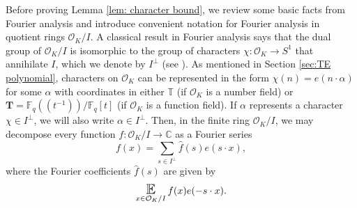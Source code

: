 \documentclass{amsart}
\theoremstyle{definition}
\numberwithin{equation}{section}
\newcommand{\C}{\mathbb{C}}
\newcommand{\T}{\mathbb{T}}
\newcommand{\F}{\mathbb{F}}
\newcommand{\mO}{\mathcal{O}}
\renewcommand{\hat}{\widehat}
\DeclareMathOperator*{\E}{\text{\Large $\mathbb{E}$}}
\begin{document}
Before proving Lemma \ref{lem: character bound}, we review some basic facts from Fourier analysis and introduce convenient notation for Fourier analysis in quotient rings $\mO_K/I$.
A classical result in Fourier analysis says that the dual group of $\mO_K/I$ is isomorphic to the group of characters $\chi : \mO_K \to S^1$ that annihilate $I$, which we denote by $I^{\perp}$ (see \cite[Theorem 2.1.2]{rudin}).
As mentioned in Section \ref{sec:TE polynomial}, characters on $\mO_K$ can be represented in the form $\chi(n) = e(n \cdot \alpha)$ for some $\alpha$ with coordinates in either $\T$ (if $\mO_K$ is a number field) or $\mathbf{T} = \F_q((t^{-1}))/\F_q[t]$ (if $\mO_K$ is a function field).
If $\alpha$ represents a character $\chi \in I^{\perp}$, we will also write $\alpha \in I^{\perp}$.
Then, in the finite ring $\mO_K/I$, we may decompose every function $f : \mO_K/I \to \C$ as a Fourier series
\begin{equation*}
    f(x) = \sum_{s \in I^{\perp}} \hat{f}(s) e(s \cdot x),
\end{equation*}
where the Fourier coefficients $\hat{f}(s)$ are given by
\begin{equation*}
    \E_{x \in \mO_K/I} f(x)e(-s \cdot x).
\end{equation*}
\end{document}
